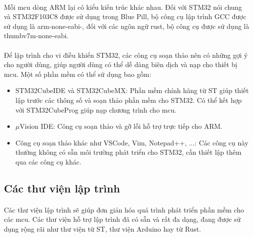 \paragraph{}
Mỗi \acrlong{mcu} dòng ARM lại có kiểu kiến trúc khác nhau. Đối với STM32 nói chung và STM32F103C8 được sử dụng trong Blue Pill, bộ công cụ lập trình GCC được sử dụng là arm-none-eabi-, đối với các ngôn ngữ rust, bộ công cụ được sử dụng là thumbv7m-none-eabi.
\paragraph{}
Để lập trình cho vi điều khiển STM32, các công cụ soạn thảo nên có những gợi ý cho người dùng, giúp người dùng có thể dễ dàng biên dịch và nạp cho thiết bị \acrlong{mcu}. Một số phần mềm có thể sử dụng bao gồm:
\begin{itemize}
    \item STM32CubeIDE và STM32CubeMX: Phần mềm chính hãng từ ST giúp thiết lập trước các thông số và soạn thảo phần mềm cho STM32. Có thể kết hợp với STM32CubeProg giúp nạp chương trình cho \acrlong{mcu}.
    \item $\mu$Vision IDE: Công cụ soạn thảo và gỡ lỗi hỗ trợ trực tiếp cho ARM.
    \item Công cụ soạn thảo khác như VSCode, Vim, Notepad++, ...: Các công cụ này thường không có sẵn môi trường phát triển cho STM32, cần thiết lập thêm qua các công cụ khác.
\end{itemize}
\subsection{Các thư viện lập trình}
\paragraph{}
Các thư viện lập trình sẽ giúp đơn giản hóa quá trình phát triển phần mềm cho các \acrlong{mcu}. Các thư viện hỗ trợ lập trình đã có sẵn và rất đa dạng, đang được sử dụng rộng rãi như thư viện từ ST, thư viện Arduino hay từ Rust.
